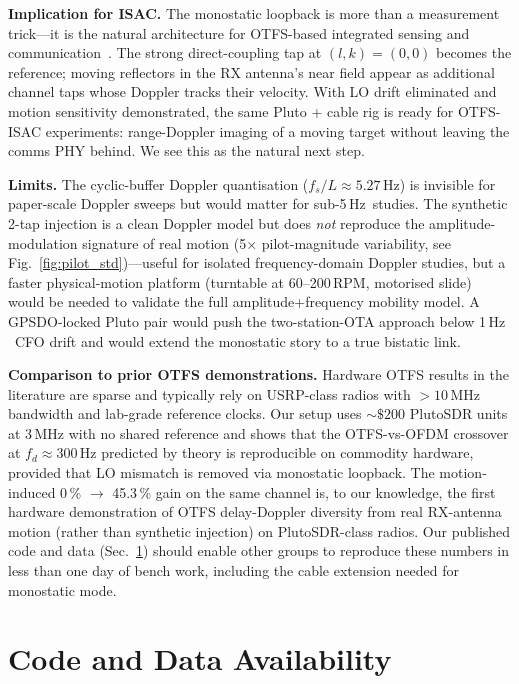 \documentclass[conference,10pt]{IEEEtran}
\newcommand{\fd}{f_d}
\newcommand{\Hz}{\ensuremath{\,\mathrm{Hz}}}
\begin{document}
\textbf{Implication for ISAC.} The monostatic loopback is more than a measurement trick---it is the natural architecture for OTFS-based integrated sensing and communication~\cite{Wei2023ISAC}. The strong direct-coupling tap at $(l, k) = (0, 0)$ becomes the reference; moving reflectors in the RX antenna's near field appear as additional channel taps whose Doppler tracks their velocity. With LO drift eliminated and motion sensitivity demonstrated, the same Pluto + cable rig is ready for OTFS-ISAC experiments: range-Doppler imaging of a moving target without leaving the comms PHY behind. We see this as the natural next step.

\textbf{Limits.} The cyclic-buffer Doppler quantisation ($f_s / L \approx 5.27\Hz$) is invisible for paper-scale Doppler sweeps but would matter for sub-5\Hz\ studies. The synthetic 2-tap injection is a clean Doppler model but does \emph{not} reproduce the amplitude-modulation signature of real motion (5$\times$ pilot-magnitude variability, see Fig.~\ref{fig:pilot_std})---useful for isolated frequency-domain Doppler studies, but a faster physical-motion platform (turntable at 60--200\,RPM, motorised slide) would be needed to validate the full amplitude+frequency mobility model. A GPSDO-locked Pluto pair would push the two-station-OTA approach below 1\Hz\ CFO drift and would extend the monostatic story to a true bistatic link.

\textbf{Comparison to prior OTFS demonstrations.} Hardware OTFS results in the literature are sparse and typically rely on USRP-class radios with ${>}10\,$MHz bandwidth and lab-grade reference clocks. Our setup uses ${\sim}\$200$ PlutoSDR units at 3\,MHz with no shared reference and shows that the OTFS-vs-OFDM crossover at $\fd \approx 300\Hz$ predicted by theory is reproducible on commodity hardware, provided that LO mismatch is removed via monostatic loopback. The motion-induced 0\,\% $\to$ 45.3\,\% gain on the same channel is, to our knowledge, the first hardware demonstration of OTFS delay-Doppler diversity from real RX-antenna motion (rather than synthetic injection) on PlutoSDR-class radios. Our published code and data (Sec.~\ref{sec:availability}) should enable other groups to reproduce these numbers in less than one day of bench work, including the cable extension needed for monostatic mode.

\section{Code and Data Availability}
\label{sec:availability}
\end{document}
